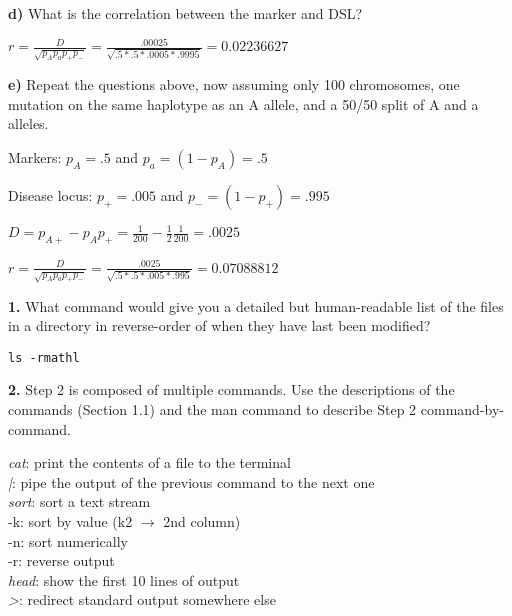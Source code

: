 \documentclass{essay}
\begin{document}
\begin{essaystyle}
\textbf{d)} What is the correlation between the marker and DSL?


$r = \frac{D}{\sqrt{p_A p_a p_+ p_-}} = \frac{.00025}{\sqrt{.5 * .5 * .0005 * .9995}} = 0.02236627$

\textbf{e)} Repeat the questions above, now assuming only 100 chromosomes, one
mutation on the same haplotype as an A allele, and a 50/50 split of A and a
alleles.

Markers: $p_A = .5$ and $p_a = (1-p_A) = .5$

Disease locus: $p_+ = .005$ and $p_- = (1-p_+) = .995$

$D = p_{A+} - p_{A}p_{+} = \frac{1}{200} - \frac{1}{2}\frac{1}{200} = .0025$

$r = \frac{D}{\sqrt{p_A p_a p_+ p_-}} = \frac{.0025}{\sqrt{.5 * .5 * .005 * .995}} = 0.07088812$

\vspace{.5em}

\textbf{1.} What command would give you a detailed but human-readable list of the files
in a directory in reverse-order of when they have last been modified?

\begin{verbatim}
ls -rmathl
\end{verbatim}


\textbf{2.} Step 2 is composed of multiple commands. Use the descriptions of the
commands (Section 1.1) and the man command to describe Step 2
command-by-command.

\textit{cat}: print the contents of a file to the terminal \\
\textit{|}: pipe the output of the previous command to the next one \\
\textit{sort}: sort a text stream \\
\hspace{.5em} -k: sort by value (k2 $\rightarrow$ 2nd column) \\
\hspace{.5em} -n: sort numerically \\
\hspace{.5em} -r: reverse output \\
\textit{head}: show the first 10 lines of output \\
\textit{>}: redirect standard output somewhere else \\



\end{essaystyle}
\end{document}
